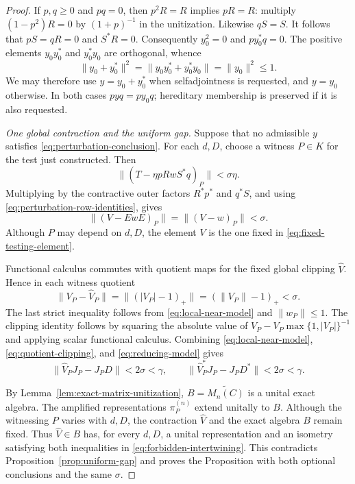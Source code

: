 \begin{proof}
If \(p,q\geq0\) and \(pq=0\), then \(p^2R=R\) implies \(pR=R\):
multiply \((1-p^2)R=0\) by \((1+p)^{-1}\) in the unitization.
Likewise \(qS=S\).  It follows that \(pS=qR=0\) and \(S^*R=0\).
Consequently \(y_0^2=0\) and \(py_0^*q=0\).  The positive elements
\(y_0y_0^*\) and \(y_0^*y_0\) are orthogonal, whence
\[
 \|y_0+y_0^*\|^2
 =\|y_0y_0^*+y_0^*y_0\|=\|y_0\|^2\leq1.
\]
We may therefore use \(y=y_0+y_0^*\) when selfadjointness is
requested, and \(y=y_0\) otherwise.  In both cases \(pyq=py_0q\);
hereditary membership is preserved if it is also requested.

\smallskip
\noindent\emph{One global contraction and the uniform gap.}
Suppose that no admissible \(y\) satisfies
\eqref{eq:perturbation-conclusion}.  For each \(d,D\), choose a
witness \(P\in K\) for the test just constructed.  Then
\[
 \|(T-\eta pRwS^*q)_P\|<\sigma\eta.
\]
Multiplying by the contractive outer factors \(R^*p^*\) and \(q^*S\),
and using \eqref{eq:perturbation-row-identities}, gives
\begin{equation}
 \|(V-EwE)_P\|=\|(V-w)_P\|<\sigma.
 \label{eq:local-near-model}
\end{equation}
Although \(P\) may depend on \(d,D\), the element \(V\) is the one
fixed in \eqref{eq:fixed-testing-element}.

Functional calculus commutes with quotient maps for the fixed global
clipping \(\widehat V\).  Hence in each witness quotient
\begin{equation}
 \|V_P-\widehat V_P\|
 =\|(|V_P|-1)_+\|
 =(\|V_P\|-1)_+<\sigma.
 \label{eq:quotient-clipping}
\end{equation}
The last strict inequality follows from \eqref{eq:local-near-model}
and \(\|w_P\|\leq1\).  The clipping identity follows by squaring the
absolute value of
\(V_P-V_P\max\{1,|V_P|\}^{-1}\) and applying scalar functional
calculus.  Combining \eqref{eq:local-near-model},
\eqref{eq:quotient-clipping}, and \eqref{eq:reducing-model} gives
\begin{equation}
 \|\widehat V_PJ_P-J_PD\|<2\sigma<\gamma,\qquad
 \|\widehat V_P^*J_P-J_PD^*\|<2\sigma<\gamma.
 \label{eq:forbidden-intertwining}
\end{equation}

By Lemma~\ref{lem:exact-matrix-unitization},
\(B=\widetilde{M_n(C)}\) is a unital exact algebra.
The amplified representations \(\pi_P^{(n)}\) extend unitally to
\(B\).  Although the witnessing \(P\) varies with \(d,D\), the
contraction \(\widehat V\) and the exact algebra \(B\) remain fixed.
Thus \(\widehat V\in B\) has, for every \(d,D\), a unital
representation and an isometry satisfying
both inequalities in \eqref{eq:forbidden-intertwining}.  This
contradicts Proposition~\ref{prop:uniform-gap} and proves the
Proposition with both optional conclusions and the same \(\sigma\).
\end{proof}
